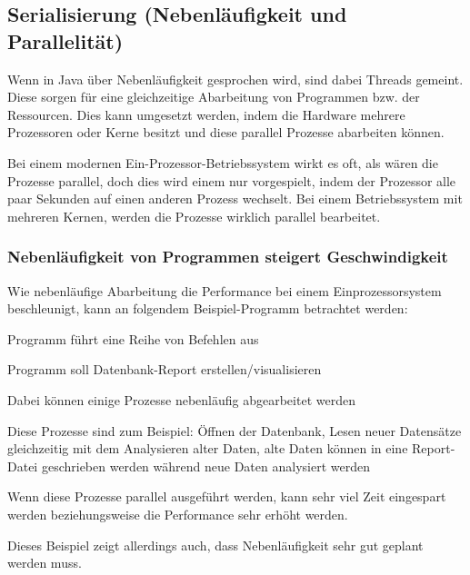  
 
 
\subsection{Serialisierung (Nebenläufigkeit und Parallelität)}
Wenn in Java über Nebenläufigkeit gesprochen wird, sind dabei Threads gemeint. Diese sorgen für eine gleichzeitige Abarbeitung von Programmen bzw. der Ressourcen. Dies kann umgesetzt werden, indem die Hardware mehrere Prozessoren oder Kerne besitzt und diese parallel Prozesse abarbeiten können.
 
Bei einem modernen Ein-Prozessor-Betriebssystem wirkt es oft, als wären die Prozesse parallel, doch dies wird einem nur vorgespielt, indem der Prozessor alle paar Sekunden auf einen anderen Prozess wechselt. Bei einem Betriebssystem mit mehreren Kernen, werden die Prozesse wirklich parallel bearbeitet. \cite{javaInselBuch}
 
\subsubsection{Nebenläufigkeit von Programmen steigert Geschwindigkeit}
Wie nebenläufige Abarbeitung die Performance bei einem Einprozessorsystem beschleunigt, kann an folgendem Beispiel-Programm betrachtet werden:
 
\begin{compactitem}
    \item Programm führt eine Reihe von Befehlen aus
    \item Programm soll Datenbank-Report erstellen/visualisieren    
    \item Dabei können einige Prozesse nebenläufig abgearbeitet werden
    \item Diese Prozesse sind zum Beispiel: Öffnen der Datenbank, Lesen neuer Datensätze gleichzeitig mit dem Analysieren alter Daten, alte Daten können in eine Report-Datei geschrieben werden während neue Daten analysiert werden
    \item Wenn diese Prozesse parallel ausgeführt werden, kann sehr viel Zeit eingespart werden beziehungsweise die Performance sehr erhöht werden.
    \item Dieses Beispiel zeigt allerdings auch, dass Nebenläufigkeit sehr gut geplant werden muss.
\end{compactitem}
\cite{javaInselBuch}
 
